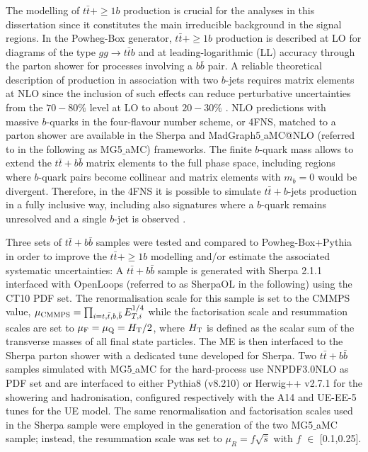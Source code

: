 \subsubsection[$t\bar{t}+\ge 1b$]{}
The modelling of $t\bar{t}+\ge1b$ production is crucial for the analyses in this dissertation since it constitutes the main irreducible background in the signal regions.
In the {\sc Powheg-Box} generator, $t\bar{t}+\ge1b$ production is described at LO for diagrams of the type $gg\to t\bar{t}b$ and at leading-logarithmic (LL) accuracy through the parton shower for processes involving a $b\bar{b}$ pair. 
A reliable theoretical description of production in association with two $b$-jets requires matrix elements at NLO since the inclusion of such effects can reduce perturbative uncertainties from the $70-80\%$ level at LO to about $20-30\%$ \cite{Bredenstein:2010rs,Bevilacqua:2009zn,Bredenstein:2009aj}.
NLO predictions with massive $b$-quarks in the four-flavour number scheme, or 4FNS, matched to a parton shower \cite{Cascioli:2013era} are available in the {\sc Sherpa} and  {\sc MadGraph5$\_$aMC@NLO} (referred to in the following as {\sc MG5$\_$aMC}) frameworks. 
The finite $b$-quark mass allows to extend the $t\bar{t}+b\bar{b}$ matrix elements to the full phase space,  including regions where $b$-quark pairs become collinear and matrix elements with $m_{b}=  0$ would be divergent. Therefore, in the 4FNS it is possible to simulate $t\bar{t}+b$-jets production in a fully inclusive way, including also signatures where a $b$-quark remains unresolved and a single $b$-jet is observed \cite{Cascioli:2013era}.\par
Three sets of $t\bar{t}+b\bar{b}$ samples were tested and compared to {\sc Powheg-Box+Pythia} in order to improve the $t\bar{t}+\ge1b$  modelling and/or estimate the associated systematic uncertainties:
\bi
\ib A $t\bar{t}+b\bar{b}$ sample is generated with {\sc Sherpa} 2.1.1 interfaced with {\sc OpenLoops} (referred to as {\sc SherpaOL} in the following) using the CT10 PDF set. The renormalisation scale for this sample is set to the CMMPS \cite{Cascioli:2013era} value, $\mu_{\rm CMMPS} = \prod_{i=t,\bar{t},b,\bar{b}} E_{T,i}^{1/4}$ while the factorisation scale and resummation scales are set to $\mu_{\rm F}=\mu_{\rm Q} =H_{\rm T}/2 $, where $H_{\rm T}$ is defined as the scalar sum of the transverse masses of all final state particles. The ME is then interfaced to the {\sc Sherpa} parton shower with a dedicated tune developed for {\sc Sherpa}.
\ib Two $t\bar{t}+b\bar{b}$ samples simulated with {\sc MG5$\_$aMC} for the hard-process use NNPDF3.0NLO \cite{Ball:2014uwa} as PDF set and are interfaced to either {\sc Pythia8} (v8.210) or {\sc Herwig++} v2.7.1 for the showering and hadronisation, configured respectively with the A14 \cite{ATLASUETune4} and UE-EE-5 \cite{Gieseke:2012ft} tunes for the UE model. The same renormalisation and factorisation scales used in the {\sc Sherpa} sample were employed in the generation of the two {\sc MG5$\_$aMC} sample; instead, the resummation scale was set to $\mu_{R}=f\sqrt{\hat{s}}$ with $f$ $\in$ [0.1,0.25].
